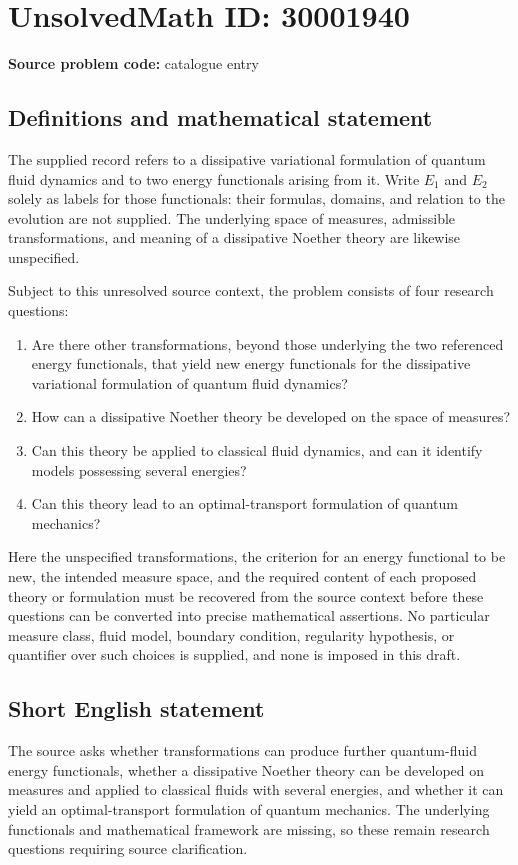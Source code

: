 \documentclass[11pt]{article}
\begin{document}
\section*{UnsolvedMath ID: 30001940}
\textbf{Source problem code:} catalogue entry
\subsection{Definitions and mathematical statement}
The supplied record refers to a dissipative variational formulation of quantum fluid dynamics and to two energy functionals arising from it. Write \(E_1\) and \(E_2\) solely as labels for those functionals: their formulas, domains, and relation to the evolution are not supplied. The underlying space of measures, admissible transformations, and meaning of a dissipative Noether theory are likewise unspecified.

Subject to this unresolved source context, the problem consists of four research questions:
\begin{enumerate}
\item Are there other transformations, beyond those underlying the two referenced energy functionals, that yield new energy functionals for the dissipative variational formulation of quantum fluid dynamics?
\item How can a dissipative Noether theory be developed on the space of measures?
\item Can this theory be applied to classical fluid dynamics, and can it identify models possessing several energies?
\item Can this theory lead to an optimal-transport formulation of quantum mechanics?
\end{enumerate}
Here the unspecified transformations, the criterion for an energy functional to be new, the intended measure space, and the required content of each proposed theory or formulation must be recovered from the source context before these questions can be converted into precise mathematical assertions. No particular measure class, fluid model, boundary condition, regularity hypothesis, or quantifier over such choices is supplied, and none is imposed in this draft.
\subsection{Short English statement}
The source asks whether transformations can produce further quantum-fluid energy functionals, whether a dissipative Noether theory can be developed on measures and applied to classical fluids with several energies, and whether it can yield an optimal-transport formulation of quantum mechanics. The underlying functionals and mathematical framework are missing, so these remain research questions requiring source clarification.
\end{document}
